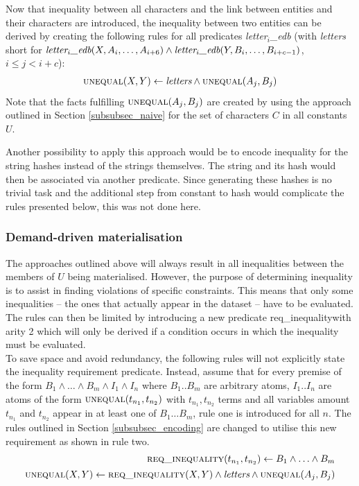 \documentclass[hyperref,bachelorofscience,fleqn]{cgvpub}
\begin{document}
Now that inequality between all characters and the link between entities and their characters are introduced, the inequality between two entities can be derived by creating the following rules for all predicates \emph{letter\(_i\)\_edb} (with \emph{letters} short for \(\emph{letter}_i\emph{\_edb}(X, A_i, \ldots, A_{i+6}) \wedge\emph{letter}_i\emph{\_edb}(Y, B_i, \ldots, B_{i+c-1})\), \(i \leq j < i + c\)):
\begin{align}
\textsc{unequal}(X, Y) \leftarrow \emph{letters} \wedge \textsc{unequal}(A_j, B_j)
\end{align}
Note that the facts fulfilling \(\textsc{unequal}(A_j, B_j)\) are created by using the approach outlined in Section \ref{subsubsec_naive} for the set of characters \(C\) in all constants \(U\).

Another possibility to apply this approach would be to encode inequality for the string hashes instead of the strings themselves. The string and its hash would then be associated via another predicate. Since generating these hashes is no trivial task and the additional step from constant to hash would complicate the rules presented below, this was not done here.

\subsubsection{Demand-driven materialisation}\label{subsubsec_demand-driven_materialisation}
The approaches outlined above will always result in all inequalities between the members of \(U\) being materialised. However, the purpose of determining inequality is to assist in finding violations of specific constraints. This means that only some inequalities -- the ones that actually appear in the dataset -- have to be evaluated. The rules can then be limited by introducing a new predicate req\_inequalitywith arity 2 which will only be derived if a condition occurs in which the inequality must be evaluated.\\

To save space and avoid redundancy, the following rules will not explicitly state the inequality requirement predicate. Instead, assume that for every premise of the form \(B_1 \wedge \ldots\wedge B_m \wedge I_1 \wedge I_n\) where \(B_1 .. B_m\) are arbitrary atoms, \(I_1 .. I_n\) are atoms of the form \(\textsc{unequal}(t_{n_1}, t_{n_2})\) with \(t_{n_1}, t_{n_2}\) terms and all variables amount \(t_{n_1}\) and \(t_{n_2}\) appear in at least one of \(B_1 \ldots B_m\), rule one is introduced for all \(n\). The rules outlined in Section \ref{subsubsec_encoding} are changed to utilise this new requirement as shown in rule two.
\begin{align}
\begin{split}
\textsc{req\_inequality}(t_{n_1}, t_{n_2})
 \leftarrow B_1 \wedge \ldots \wedge B_m
\end{split}\\
\begin{split}
\textsc{unequal}(X, Y) \leftarrow \textsc{req\_inequality}	(X, Y) \wedge \emph{letters} \wedge \textsc{unequal}(A_j, B_j)
\end{split}
\end{align}
\end{document}
